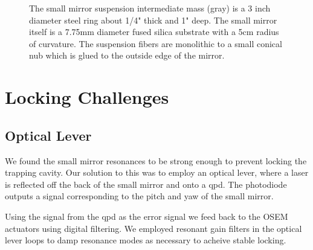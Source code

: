 \begin{figure}
\centering
{}
\caption[Small Mirror Suspension]{The small mirror suspension intermediate
         mass (gray) is a 3 inch diameter steel ring about 1/4" thick and 1"
         deep. The small mirror itself is a 7.75mm diameter fused silica
         substrate with a 5cm radius of curvature. The suspension fibers are
         monolithic to a small conical nub which is glued to the outside edge
         of the mirror.}
\label{fig:smallsus}
\end{figure}



\section{Locking Challenges}

\subsection{Optical Lever}
We found the small mirror resonances to be strong enough to prevent locking the
trapping cavity. Our solution to this was to employ an optical lever, where a
laser is reflected off the back of the small mirror and onto a \ac{qpd}.
The photodiode outputs a signal corresponding to the pitch and yaw
of the small mirror.

Using the signal from the \ac{qpd} as the error signal we feed back to the
OSEM actuators using digital filtering.
We employed resonant gain filters in the optical lever loops to damp resonance
modes as necessary to acheive stable locking.

